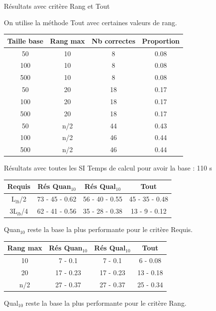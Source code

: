 \documentclass{beamer}
\begin{document}
\begin{frame}{Résultats avec critère Rang et Tout}

On utilise la méthode Tout avec certaines valeurs de rang.
\begin{tabular}{|c|c|c|c|}
   \hline
   Taille base & Rang max & Nb correctes & Proportion\\
   \hline
   50 & 10  & 8 & 0.08  \\
   \hline
   100 & 10  & 8 & 0.08  \\
   \hline
   500 & 10  & 8 & 0.08  \\
   \hline
   \hline
   50 & 20  & 18 & 0.17  \\
   \hline
   100 & 20 & 18 & 0.17  \\
   \hline
   500 & 20 & 18 & 0.17  \\
   \hline
   50 & n/2 & 44 & 0.43  \\
   \hline
   100 & n/2 & 46 & 0.44  \\
   \hline
   500 & n/2 & 46 & 0.44  \\
   \hline
\end{tabular}
\end{frame}


\begin{frame}{Résultats avec toutes les SI}
Temps de calcul pour avoir la base : 110 s

\centering
\begin{tabular}{|c|c|c|c|}
   \hline
   Requis & Rés Quan$_{10}$ & Rés Qual$_{10}$ & Tout \\
   \hline
   L$_{lb}$/2 & 73 - 45 - 0.62 & 56 - 40 - 0.55 & 45 - 35 - 0.48 \\
   \hline
   3L$_{lb}$/4 & 62 - 41 - 0.56 & 35 - 28 - 0.38  & 13 - 9 - 0.12 \\
   \hline
\end{tabular}

Quan$_{10}$ reste la base la plus performante pour le critère Requis.

\begin{tabular}{|c|c|c|c|}
   \hline
   Rang max & Rés Quan$_{10}$ & Rés Qual$_{10}$ & Tout \\
   \hline
   10 & 7 - 0.1 & 7 - 0.1 & 6 - 0.08 \\
   \hline
   20 & 17 - 0.23 & 17 - 0.23 & 13 - 0.18 \\
   \hline
   n/2 & 27 - 0.37 & 27 - 0.37 & 25 - 0.34 \\
   \hline
\end{tabular}

Qual$_{10}$ reste la base la plus performante pour le critère Rang.
\end{frame}
\end{document}
